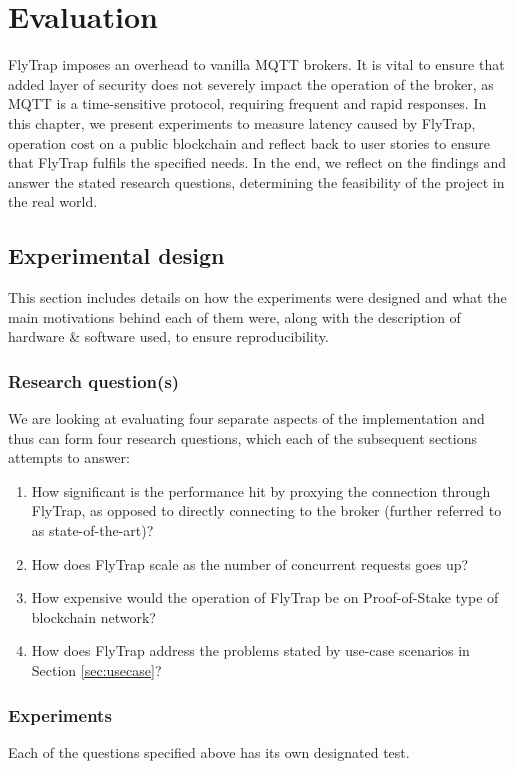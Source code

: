 \chapter{Evaluation}\label{chap:evaluation}
FlyTrap imposes an overhead to vanilla MQTT brokers. It is vital to ensure that added layer of security does not severely impact the operation of the broker, as MQTT is a time-sensitive protocol, requiring frequent and rapid responses. In this chapter, we present experiments to measure latency caused by FlyTrap, operation cost on a public blockchain and reflect back to user stories to ensure that FlyTrap fulfils the specified needs. In the end, we reflect on the findings and answer the stated research questions, determining the feasibility of the project in the real world.

\section{Experimental design}
This section includes details on how the experiments were designed and what the main motivations behind each of them were, along with the description of hardware \& software used, to ensure reproducibility.
\subsection{Research question(s)}
We are looking at evaluating four separate aspects of the implementation and thus can form four research questions, which each of the subsequent sections attempts to answer:
\begin{enumerate}
  \item How significant is the performance hit by proxying the connection through FlyTrap, as opposed to directly connecting to the broker (further referred to as state-of-the-art)?
  \item How does FlyTrap scale as the number of concurrent requests goes up?
  \item How expensive would the operation of FlyTrap be on Proof-of-Stake type of blockchain network?
  \item How does FlyTrap address the problems stated by use-case scenarios in Section \ref{sec:usecase}?
\end{enumerate}
\subsection{Experiments}
Each of the questions specified above has its own designated test.

